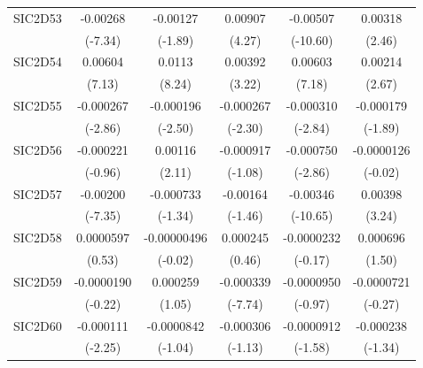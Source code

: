 \begin{table}[htbp]
\begin{tabular}{l*{5}{c}}
SIC2D53     &    -0.00268\sym{***}&    -0.00127         &     0.00907\sym{***}&    -0.00507\sym{***}&     0.00318\sym{*}  \\
            &     (-7.34)         &     (-1.89)         &      (4.27)         &    (-10.60)         &      (2.46)         \\
SIC2D54     &     0.00604\sym{***}&      0.0113\sym{***}&     0.00392\sym{**} &     0.00603\sym{***}&     0.00214\sym{**} \\
            &      (7.13)         &      (8.24)         &      (3.22)         &      (7.18)         &      (2.67)         \\
SIC2D55     &   -0.000267\sym{**} &   -0.000196\sym{*}  &   -0.000267\sym{*}  &   -0.000310\sym{**} &   -0.000179         \\
            &     (-2.86)         &     (-2.50)         &     (-2.30)         &     (-2.84)         &     (-1.89)         \\
SIC2D56     &   -0.000221         &     0.00116\sym{*}  &   -0.000917         &   -0.000750\sym{**} &  -0.0000126         \\
            &     (-0.96)         &      (2.11)         &     (-1.08)         &     (-2.86)         &     (-0.02)         \\
SIC2D57     &    -0.00200\sym{***}&   -0.000733         &    -0.00164         &    -0.00346\sym{***}&     0.00398\sym{**} \\
            &     (-7.35)         &     (-1.34)         &     (-1.46)         &    (-10.65)         &      (3.24)         \\
SIC2D58     &   0.0000597         & -0.00000496         &    0.000245         &  -0.0000232         &    0.000696         \\
            &      (0.53)         &     (-0.02)         &      (0.46)         &     (-0.17)         &      (1.50)         \\
SIC2D59     &  -0.0000190         &    0.000259         &   -0.000339\sym{***}&  -0.0000950         &  -0.0000721         \\
            &     (-0.22)         &      (1.05)         &     (-7.74)         &     (-0.97)         &     (-0.27)         \\
SIC2D60     &   -0.000111\sym{*}  &  -0.0000842         &   -0.000306         &  -0.0000912         &   -0.000238         \\
            &     (-2.25)         &     (-1.04)         &     (-1.13)         &     (-1.58)         &     (-1.34)         \\

\end{tabular}
\end{table}
